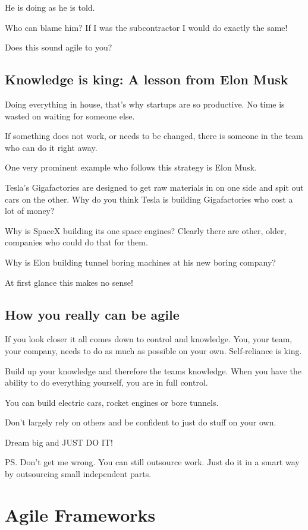 \documentclass[12pt, numbers=noenddot]{scrreprt} %
\begin{document}
He is doing as he is told.

Who can blame him? If I was the subcontractor I would do exactly the same!

Does this sound agile to you?

\subsection{Knowledge is king: A lesson from Elon Musk}
Doing everything in house, that’s why startups are so productive. No time is wasted on waiting for someone else.

If something does not work, or needs to be changed, there is someone in the team who can do it right away.

One very prominent example who follows this strategy is Elon Musk.

Tesla’s Gigafactories are designed to get raw materials in on one side and spit out cars on the other. Why do you think Tesla is building Gigafactories who cost a lot of money?

Why is SpaceX building its one space engines? Clearly there are other, older, companies who could do that for them.

Why is Elon building tunnel boring machines at his new boring company?

At first glance this makes no sense!

\subsection{How you really can be agile}
If you look closer it all comes down to control and knowledge. You, your team, your company, needs to do as much as possible on your own. Self-reliance is king.

Build up your knowledge and therefore the teams knowledge. When you have the ability to do everything yourself, you are in full control.

You can build electric cars, rocket engines or bore tunnels.

Don’t largely rely on others and be confident to just do stuff on your own.

Dream big and JUST DO IT!

PS. Don’t get me wrong. You can still outsource work. Just do it in a smart way by outsourcing small independent parts.

\section{Agile Frameworks}
\end{document}

